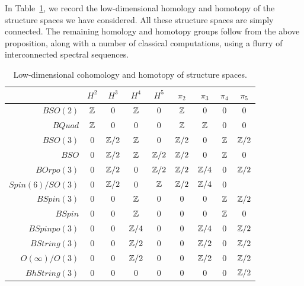 \documentclass{amsart}
\begin{document}
In Table~\ref{table-structurecalc}, we record the low-dimensional homology and homotopy of the structure spaces we have considered.  All these structure spaces are simply connected.  The remaining homology and homotopy groups follow from the above proposition, along with a number of classical computations, using a flurry of interconnected spectral sequences.  

\begin{table}[!ht]
\begin{tabular}{|r||c|c|c|c||c|c|c|c|}
\hline
& $H^2$ & $H^3$ & $H^4$ & $H^5$ & $\pi_2$ & $\pi_3$ & $\pi_4$ & $\pi_5$ \\
\hline
$BSO(2)$ %
& $\mathbb Z$ & $0$ & $\mathbb Z$ & $0$ 
& $\mathbb Z$ & $0$ & $0$ & $0$ \\
$BQuad$ %
& $\mathbb Z$ & $0$ & $0$ & $0$
& $\mathbb Z$ & $\mathbb Z$ & $0$ & $0$ \\
$BSO(3)$ %
& $0$ & $\mathbb Z/2$ & $\mathbb Z$ & $0$
& $\mathbb Z/2$ & $0$ & $\mathbb Z$ & $\mathbb Z/2$ \\ %
$BSO$
& $0$ & $\mathbb Z/2$ & $\mathbb Z$ & $\mathbb Z/2$ %
& $\mathbb Z/2$ & $0$ & $\mathbb Z$ & $0$ \\ %
$BOrpo(3)$ %
& $0$ & $\mathbb Z/2$ & $0$ & $\mathbb Z/2$ 
& $\mathbb Z/2$ & $\mathbb Z/4$ & $0$ & $\mathbb Z/2$  \\
$Spin(6)/SO(3)$ %
& $0$ & $\mathbb Z/2$ & $0$ & $\mathbb Z$ %
& $\mathbb Z/2$ & $\mathbb Z/4$ & $0$ & \CDcomm{$??$} \\
$BSpin(3)$ %
& $0$ & $0$ & $\mathbb Z$ & $0$
& $0$ & $0$ & $\mathbb Z$ & $\mathbb Z/2$ \\
$BSpin$
& $0$ & $0$ & $\mathbb Z$ & $0$ %
& $0$ & $0$ & $\mathbb Z$ & $0$ \\ %
$BSpinpo(3)$
& $0$ & $0$ & $\mathbb Z/4$ & $0$
& $0$ & $\mathbb Z/4$ & $0$ & $\mathbb Z/2$ \\
$BString(3)$ %
& $0$ & $0$ & $\mathbb Z/2$ & $0$
& $0$ & $\mathbb Z/2$ & $0$ & $\mathbb Z/2$ \\
$O(\infty)/O(3)$ %
& $0$ & $0$ & $\mathbb Z/2$ & $0$
& $0$ & $\mathbb Z/2$ & $0$ & $\mathbb Z/2$ \\
$BhString(3)$ %
& $0$ & $0$ & $0$ & $0$
& $0$ & $0$ & $0$ & $\mathbb Z/2$ \\
\hline 
\end{tabular} \vspace*{8pt}
\caption{Low-dimensional cohomology and homotopy of structure spaces.} \label{table-structurecalc}
\end{table} 
\end{document}
